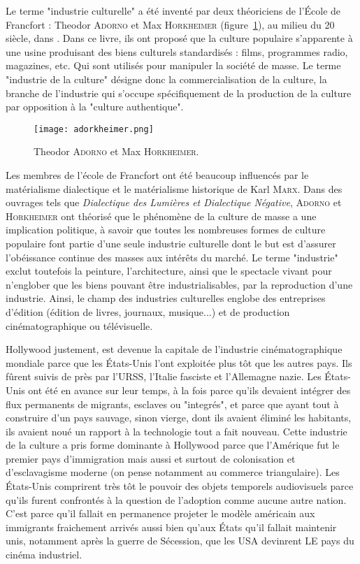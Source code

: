 \documentclass[a4paper,14pt]{extreport}
\begin{document}
Le terme "industrie culturelle" a été inventé par deux théoriciens de l’École de Francfort : Theodor \textsc{Adorno} et Max \textsc{Horkheimer} (figure~\ref{adorkheimer}), au milieu du 20 siècle, dans \cite{dial_raison}. Dans ce livre, ils ont proposé que la culture populaire s'apparente à une usine produisant des biens culturels standardisés : films, programmes radio, magazines, etc. Qui sont utilisés pour manipuler la société de masse. Le terme "industrie de la culture" désigne donc la commercialisation de la culture, la branche de l'industrie qui s'occupe spécifiquement de la production de la culture par opposition à la "culture authentique".

\begin{figure}[ht]
 \begin{center}
  \texttt{[image: adorkheimer.png]}
 \end{center}
\caption{Theodor \textsc{Adorno} et Max \textsc{Horkheimer}.}
 \label{adorkheimer}
\end{figure}

Les membres de l'école de Francfort ont été beaucoup influencés par le matérialisme dialectique et le matérialisme historique de Karl \textsc{Marx}. Dans des ouvrages tels que \textit{Dialectique des Lumières et Dialectique Négative}, \textsc{Adorno} et \textsc{Horkheimer} ont théorisé que le phénomène de la culture de masse a une implication politique, à savoir que toutes les nombreuses formes de culture populaire font partie d'une seule industrie culturelle dont le but est d'assurer l'obéissance continue des masses aux intérêts du marché. Le terme "industrie" exclut toutefois la peinture, l'architecture, ainsi que le spectacle vivant pour n'englober que les biens pouvant être industrialisables, par la reproduction d’une industrie. Ainsi, le champ des industries culturelles englobe des entreprises d'édition (édition de livres, journaux, musique...) et de production cinématographique ou télévisuelle.

Hollywood justement, est devenue la capitale de l’industrie cinématographique mondiale parce que les États-Unis l'ont exploitée plus tôt que les autres pays. Ils fûrent suivis de près par l'URSS, l'Italie fasciste et l'Allemagne nazie. Les États-Unis ont été en avance sur leur temps, à la fois parce qu'ils devaient intégrer des flux permanents de migrants, esclaves ou "integrés", et parce que ayant tout à construire d'un pays sauvage, sinon vierge, dont ils avaient éliminé les habitants, ils avaient noué un rapport à la technologie tout a fait nouveau. Cette industrie de la culture a pris forme dominante à Hollywood parce que l'Amérique fut le premier pays d'immigration mais aussi et surtout de colonisation et d'esclavagisme moderne (on pense notamment au commerce triangulaire). Les États-Unis comprirent très tôt le pouvoir des objets temporels audiovisuels parce qu'ils furent confrontés à la question de l'adoption comme aucune autre nation. C'est parce qu'il fallait en permanence projeter le modèle américain aux immigrants fraichement arrivés aussi bien qu'aux États qu’il fallait maintenir unis, notamment après la guerre de Sécession, que les USA devinrent LE pays du cinéma industriel.
\end{document}

